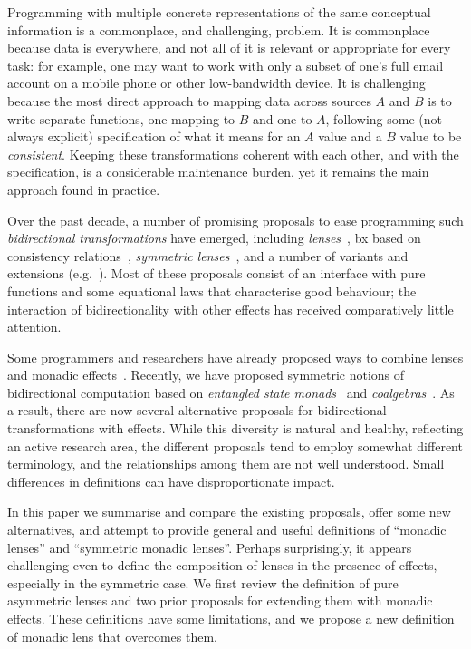 \documentclass[runningheads]{llncs}
\newcommand{\Conid}[1]{\mathit{#1}}
\begin{document}
Programming with multiple concrete representations of the same conceptual
information is a commonplace, and challenging, problem. It is commonplace
because data is everywhere, and not all of it is relevant or appropriate
for every task: for example, one may want to work with only a subset of
one's full email account on a mobile phone or other low-bandwidth device.
It is challenging because the most direct approach to mapping data across
sources \ensuremath{\Conid{A}} and \ensuremath{\Conid{B}} is to write separate functions,
one mapping to \ensuremath{\Conid{B}} and one to \ensuremath{\Conid{A}},
following some (not always explicit) specification of what it
means for an \ensuremath{\Conid{A}} value and a \ensuremath{\Conid{B}} value to be \emph{consistent}. Keeping
these transformations coherent with each other, and with the specification,
is a considerable maintenance burden, yet it remains the main approach
found in practice.

Over the past decade, a number of promising proposals to ease
programming such \emph{bidirectional transformations} have emerged,
including \emph{lenses}~\citep{lens-toplas}, bx based on consistency
relations~\citep{stevens09:sosym}, \emph{symmetric
  lenses}~\citep{symlens}, and a number of variants and
extensions (e.g.~\citep{pacheco14pepm,johnson14bx}).  
Most of these proposals consist of an interface
with pure functions and some equational laws that characterise
good behaviour; the interaction of bidirectionality with
other effects has received comparatively little attention.  




Some programmers and researchers have already proposed ways to combine
lenses and monadic effects~\citep{reddit,pacheco14pepm}.  Recently, we
have proposed symmetric notions of bidirectional computation based on
\emph{entangled state monads}~\citep{cheney14bx2,abousaleh15mpc} and
\emph{coalgebras}~\citep{abousaleh15bx}.  As a result, there are now
several alternative proposals for bidirectional transformations with
effects.  While this diversity is natural and healthy, reflecting an
active research area, the different proposals tend to employ somewhat
different terminology, and the relationships among them are not well
understood.  Small differences in definitions can have
disproportionate impact.  



In this paper we summarise and compare the existing proposals, offer
some new alternatives, and attempt to provide general and useful
definitions of ``monadic lenses'' and ``symmetric monadic lenses''.
Perhaps surprisingly, it appears challenging even to define the
composition of lenses in the presence of effects, especially in the
symmetric case.  We first review the definition of pure asymmetric
lenses and two
prior
proposals for extending them with monadic effects. These
definitions have some limitations, and we propose a new definition of
monadic lens that overcomes them.  
\end{document}
